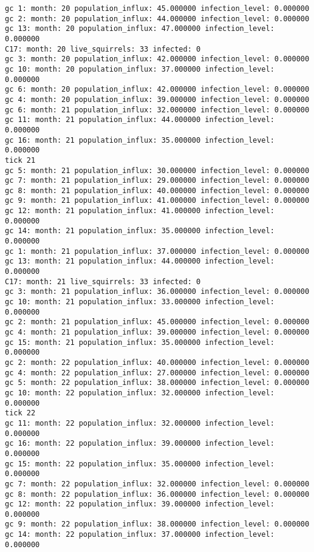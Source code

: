 \begin{lstlisting}[basicstyle=\tiny]
gc 1: month: 20 population_influx: 45.000000 infection_level: 0.000000
gc 2: month: 20 population_influx: 44.000000 infection_level: 0.000000
gc 13: month: 20 population_influx: 47.000000 infection_level: 0.000000
C17: month: 20 live_squirrels: 33 infected: 0
gc 3: month: 20 population_influx: 42.000000 infection_level: 0.000000
gc 10: month: 20 population_influx: 37.000000 infection_level: 0.000000
gc 6: month: 20 population_influx: 42.000000 infection_level: 0.000000
gc 4: month: 20 population_influx: 39.000000 infection_level: 0.000000
gc 6: month: 21 population_influx: 32.000000 infection_level: 0.000000
gc 11: month: 21 population_influx: 44.000000 infection_level: 0.000000
gc 16: month: 21 population_influx: 35.000000 infection_level: 0.000000
tick 21
gc 5: month: 21 population_influx: 30.000000 infection_level: 0.000000
gc 7: month: 21 population_influx: 29.000000 infection_level: 0.000000
gc 8: month: 21 population_influx: 40.000000 infection_level: 0.000000
gc 9: month: 21 population_influx: 41.000000 infection_level: 0.000000
gc 12: month: 21 population_influx: 41.000000 infection_level: 0.000000
gc 14: month: 21 population_influx: 35.000000 infection_level: 0.000000
gc 1: month: 21 population_influx: 37.000000 infection_level: 0.000000
gc 13: month: 21 population_influx: 44.000000 infection_level: 0.000000
C17: month: 21 live_squirrels: 33 infected: 0
gc 3: month: 21 population_influx: 36.000000 infection_level: 0.000000
gc 10: month: 21 population_influx: 33.000000 infection_level: 0.000000
gc 2: month: 21 population_influx: 45.000000 infection_level: 0.000000
gc 4: month: 21 population_influx: 39.000000 infection_level: 0.000000
gc 15: month: 21 population_influx: 35.000000 infection_level: 0.000000
gc 2: month: 22 population_influx: 40.000000 infection_level: 0.000000
gc 4: month: 22 population_influx: 27.000000 infection_level: 0.000000
gc 5: month: 22 population_influx: 38.000000 infection_level: 0.000000
gc 10: month: 22 population_influx: 32.000000 infection_level: 0.000000
tick 22
gc 11: month: 22 population_influx: 32.000000 infection_level: 0.000000
gc 16: month: 22 population_influx: 39.000000 infection_level: 0.000000
gc 15: month: 22 population_influx: 35.000000 infection_level: 0.000000
gc 7: month: 22 population_influx: 32.000000 infection_level: 0.000000
gc 8: month: 22 population_influx: 36.000000 infection_level: 0.000000
gc 12: month: 22 population_influx: 39.000000 infection_level: 0.000000
gc 9: month: 22 population_influx: 38.000000 infection_level: 0.000000
gc 14: month: 22 population_influx: 37.000000 infection_level: 0.000000

\end{lstlisting}
